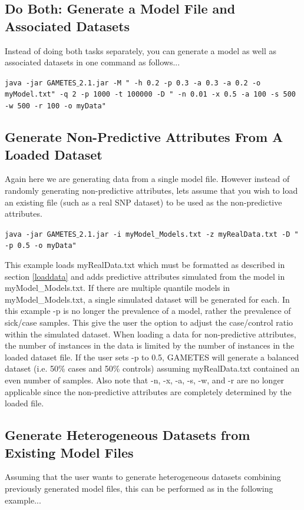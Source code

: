 \documentclass{report}
\begin{document}
\subsection{Do Both: Generate a Model File and Associated Datasets}
Instead of doing both tasks separately, you can generate a model as well as associated datasets in one command as follows...

\begin{center}
\texttt{java -jar GAMETES$\_$2.1.jar -M " -h 0.2 -p 0.3 -a 0.3 -a 0.2 -o myModel.txt" -q 2 -p 1000 -t 100000  -D " -n 0.01 -x 0.5 -a 100 -s 500 -w 500 -r 100 -o myData"}
\end{center}

\subsection{Generate Non-Predictive Attributes From A Loaded Dataset}
Again here we are generating data from a single model file.  However instead of randomly generating non-predictive attributes, lets assume that you wish to load an existing file (such as a real SNP dataset) to be used as the non-predictive attributes.

\begin{center}
\texttt{java -jar GAMETES$\_$2.1.jar -i myModel\_Models.txt -z myRealData.txt -D " -p 0.5 -o myData"}
\end{center}

This example loads myRealData.txt which must be formatted as described in section \ref{loaddata} and adds predictive attributes simulated from the model in myModel\_Models.txt.  If there are multiple quantile models in myModel\_Models.txt, a single simulated dataset will be generated for each.  In this example -p is no longer the prevalence of a model, rather the prevalence of  sick/case samples.  This give the user the option to adjust the case/control ratio within the simulated dataset.  When loading a data for non-predictive attributes, the number of instances in the data is limited by the number of instances in the loaded dataset file.  If the user sets -p to 0.5, GAMETES will generate a balanced dataset (i.e. 50\% cases and 50\% controls) assuming myRealData.txt contained an even number of samples.  Also note that -n, -x, -a, -s, -w, and -r are no longer applicable since the non-predictive attributes are completely determined by the loaded file.

\subsection{Generate Heterogeneous Datasets from Existing Model Files}
Assuming that the user wants to generate heterogeneous datasets combining previously generated model files, this can be performed as in the following example...
\end{document}
